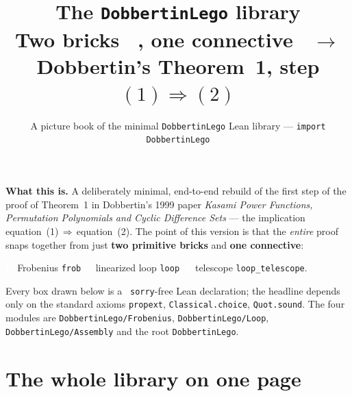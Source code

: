 \documentclass[11pt]{article}
\title{\vspace{-1.5cm}\textbf{The \texttt{DobbertinLego} library}\\[4pt]
\large Two bricks \bF\ \bL, one connective \bT\ $\to$ Dobbertin's Theorem~1, step
$(1)\Rightarrow(2)$}
\author{\small A picture book of the minimal \texttt{DobbertinLego} Lean library
--- \texttt{import DobbertinLego}}
\date{}
\newcommand{\bF}{{\colorbox{faceF}{\textcolor{white}{\scriptsize\bfseries F}}}}
\newcommand{\bL}{{\colorbox{faceL}{\textcolor{white}{\scriptsize\bfseries L}}}}
\newcommand{\bT}{{\colorbox{conn}{\textcolor{white}{\scriptsize\bfseries T}}}}
\newcommand{\ck}{\textcolor{grn}{\checkmark}}
\newcommand{\lc}[1]{\texttt{\small #1}}
\begin{document}
\maketitle
\vspace{-1.0cm}

\begin{note}
\textbf{What this is.} A deliberately minimal, end-to-end rebuild of the first
step of the proof of Theorem~1 in Dobbertin's 1999 paper \emph{Kasami Power
Functions, Permutation Polynomials and Cyclic Difference Sets} --- the
implication equation~(1)\,$\Rightarrow$\,equation~(2). The point of this version
is that the \emph{entire} proof snaps together from just \textbf{two primitive
bricks} and \textbf{one connective}:
\begin{center}
\bF\ Frobenius \lc{frob}\qquad
\bL\ linearized loop \lc{loop}\qquad
\bT\ telescope \lc{loop\_telescope}.
\end{center}
Every box drawn below is a \ck\ \lc{sorry}-free Lean declaration; the headline
depends only on the standard axioms \lc{propext}, \lc{Classical.choice},
\lc{Quot.sound}. The four modules are \lc{DobbertinLego/Frobenius},
\lc{DobbertinLego/Loop}, \lc{DobbertinLego/Assembly} and the root
\lc{DobbertinLego}.
\end{note}

\section*{The whole library on one page}
\end{document}
